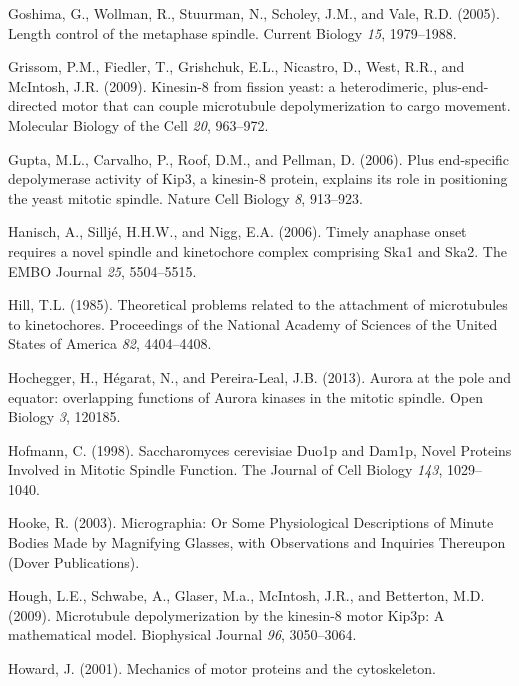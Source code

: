 \documentclass[12pt,a4paper,twoside,openright]{book}
\begin{document}
\hypertarget{ref-Goshima2005}{}
Goshima, G., Wollman, R., Stuurman, N., Scholey, J.M., and Vale, R.D.
(2005). Length control of the metaphase spindle. Current Biology
\emph{15}, 1979--1988.

\hypertarget{ref-Grissom2009}{}
Grissom, P.M., Fiedler, T., Grishchuk, E.L., Nicastro, D., West, R.R.,
and McIntosh, J.R. (2009). Kinesin-8 from fission yeast: a
heterodimeric, plus-end-directed motor that can couple microtubule
depolymerization to cargo movement. Molecular Biology of the Cell
\emph{20}, 963--972.

\hypertarget{ref-Gupta2006}{}
Gupta, M.L., Carvalho, P., Roof, D.M., and Pellman, D. (2006). Plus
end-specific depolymerase activity of Kip3, a kinesin-8 protein,
explains its role in positioning the yeast mitotic spindle. Nature Cell
Biology \emph{8}, 913--923.

\hypertarget{ref-Hanisch2006}{}
Hanisch, A., Silljé, H.H.W., and Nigg, E.A. (2006). Timely anaphase
onset requires a novel spindle and kinetochore complex comprising Ska1
and Ska2. The EMBO Journal \emph{25}, 5504--5515.

\hypertarget{ref-Hill1985}{}
Hill, T.L. (1985). Theoretical problems related to the attachment of
microtubules to kinetochores. Proceedings of the National Academy of
Sciences of the United States of America \emph{82}, 4404--4408.

\hypertarget{ref-Hochegger2013}{}
Hochegger, H., Hégarat, N., and Pereira-Leal, J.B. (2013). Aurora at the
pole and equator: overlapping functions of Aurora kinases in the mitotic
spindle. Open Biology \emph{3}, 120185.

\hypertarget{ref-Hofmann1998}{}
Hofmann, C. (1998). Saccharomyces cerevisiae Duo1p and Dam1p, Novel
Proteins Involved in Mitotic Spindle Function. The Journal of Cell
Biology \emph{143}, 1029--1040.

\hypertarget{ref-hooke2003micrographia}{}
Hooke, R. (2003). Micrographia: Or Some Physiological Descriptions of
Minute Bodies Made by Magnifying Glasses, with Observations and
Inquiries Thereupon (Dover Publications).

\hypertarget{ref-Hough2009}{}
Hough, L.E., Schwabe, A., Glaser, M.a., McIntosh, J.R., and Betterton,
M.D. (2009). Microtubule depolymerization by the kinesin-8 motor Kip3p:
A mathematical model. Biophysical Journal \emph{96}, 3050--3064.

\hypertarget{ref-Howard2001}{}
Howard, J. (2001). Mechanics of motor proteins and the cytoskeleton.
\end{document}
